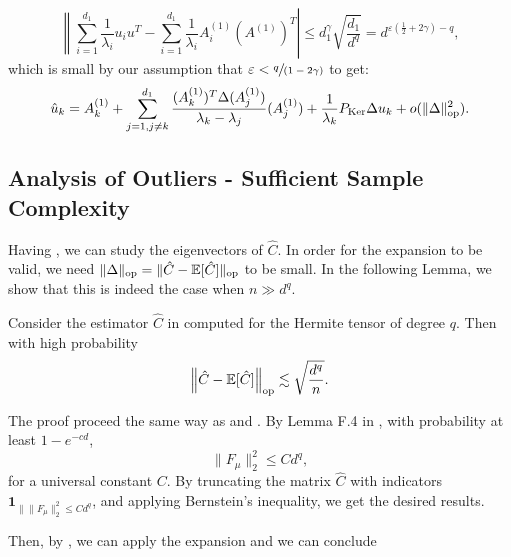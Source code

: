 \documentclass[]{article}
\makeatletter
\numberwithin{equation}{section}
\theoremstyle{definition}
\renewenvironment{proof}[1][\proofname]{\par
  \pushQED{\qed}%
  \normalfont \topsep6\p@\@plus6\p@\relax
  \trivlist
  \item[\hskip\labelsep\textbf{#1.}]\ignorespaces
}{%
  \popQED\endtrivlist\@endpefalse
}
\newcommand{\EE}{\mathbb{E}}
\def\op{{\rm op}}
\makeatother
\begin{document}
\begin{equation}
    \left \| \sum_{i=1}^{d_1} \dfrac{1}{\lambda_i} u_i u^T - \sum_{i=1}^{d_1} \dfrac{1}{\lambda_i} A^{(1)}_i (A^{(1)})^T \right | \leq d_1^{\gamma} \sqrt{\dfrac{d_1}{d^q}} = d^{\varepsilon (\frac{1}{2} +2\gamma) - q},
\end{equation}
which is small by our assumption that  $\varepsilon < \sfrac{q}{(1- 2\gamma)}$ to get: 
\begin{equation}
    \hat{u}_{k} = A^{(1)}_{k }+\sum_{j=1, j\not = k}^{d_1} \dfrac{(A^{(1)}_{k})^T \Delta (A^{(1)}_{j})}{\lambda_{k} - \lambda_{j}} (A^{(1)}_{j}) + \dfrac{1}{\lambda_{k}}P_{\mathrm{Ker}} \Delta u_{k} + o(\| \Delta\|_\op^2). 
\end{equation}


\subsection{Analysis of Outliers - Sufficient Sample Complexity}
\label{appendix:proof_thm_1}
Having , we can study the eigenvectors of $\hat{C}$. In order for the expansion to be valid, we need $\|\Delta\|_\op = \| \hat{C} - \EE[\hat{C}]\|_\op$ to be small. In the following Lemma, we show that this is indeed the case when $n \gg d^{q}$. 

\begin{lemma}
Consider the estimator $\hat{C}$ in  computed for the Hermite tensor of degree $q$. Then with high probability
\begin{equation}
    \left \| \hat{C} - \EE[\hat{C}]\right \|_\op \lesssim \sqrt{\dfrac{d^{q}}{n}}.
\end{equation}
\label{lemma:matrix_bernstein_c_hat}
\end{lemma}

\begin{proof}
    The proof proceed the same way as \cite{tabanelli2026deep} and \cite{wen2025does}. By Lemma F.4 in \cite{wen2025does}, with probability at least $1 - e^{-cd}$, 
    \begin{equation}
        \| F_\mu \|^{2}_2 \leq C d^{q},
    \end{equation}
    for a universal constant $C$. By truncating the matrix $\hat{C}$ with indicators $\mathbf{1}_{\| \| F_\mu \|^{2}_2 \leq C d^{q}}$, and applying Bernstein's inequality, we get the desired results. 
\end{proof}

Then, by , we can apply the expansion  and we can conclude 
\end{document}
